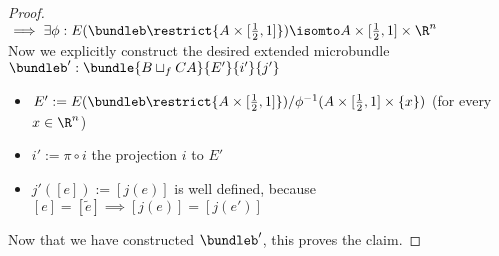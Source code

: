 \begin{proof}
    \\ $\implies \exists \phi: E(\bundleb\restrict{A \times [\frac{1}{2}, 1]}) \isomto A \times [\frac{1}{2}, 1] \times \R^n$
    \\ Now we explicitly construct the desired extended microbundle $\bundleb':\bundle{B \sqcup_f CA}{E'}{i'}{j'}$
    \begin{itemize}
        \item $E' := E(\bundleb\restrict{A \times [\frac{1}{2}, 1]}) / \phi^{-1}(A \times [\frac{1}{2}, 1] \times \{x\})$ (for every $x \in \R^n$)
        \item $i' := \pi \circ i$ the projection $i$ to $E'$
        \item $j'([e]) := [j(e)]$ is well defined, because $[e] = [\tilde{e}] \implies [j(e)] = [j(e')]$
    \end{itemize}
    Now that we have constructed $\bundleb'$, this proves the claim.
\end{proof}